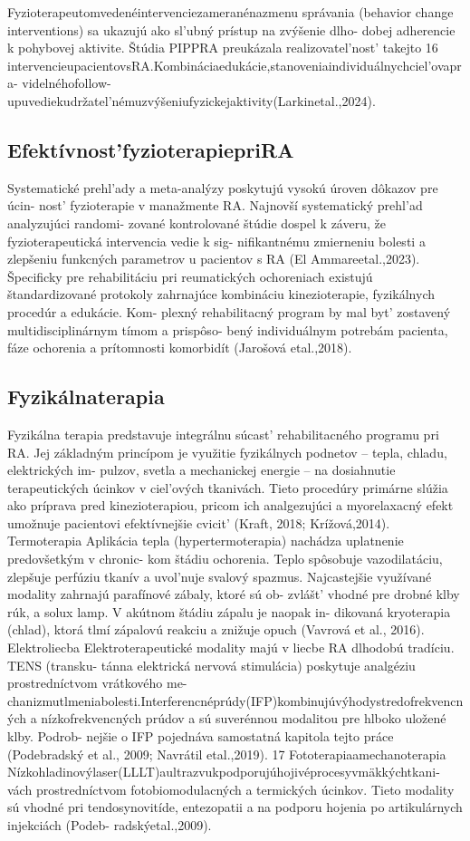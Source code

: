 Fyzioterapeutomvedenéintervenciezameranénazmenu správania (behavior change interventions) sa ukazujú ako sl’ubný prístup na zvýšenie dlho- dobej adherencie k pohybovej aktivite. Štúdia PIPPRA preukázala realizovatel’nost’ takejto 16 intervencieupacientovsRA.Kombináciaedukácie,stanoveniaindividuálnychciel’ovapra- videlnéhofollow-upuvediekudržatel’némuzvýšeniufyzickejaktivity(Larkinetal.,2024).


\subsection{Efektívnost’fyzioterapiepriRA}

Systematické prehl’ady a meta-analýzy poskytujú vysokú úroven dôkazov pre úcin- nost’ fyzioterapie v manažmente RA. Najnovší systematický prehl’ad analyzujúci randomi- zované kontrolované štúdie dospel k záveru, že fyzioterapeutická intervencia vedie k sig- nifikantnému zmierneniu bolesti a zlepšeniu funkcných parametrov u pacientov s RA (El Ammareetal.,2023). Špecificky pre rehabilitáciu pri reumatických ochoreniach existujú štandardizované protokoly zahrnajúce kombináciu kinezioterapie, fyzikálnych procedúr a edukácie. Kom- plexný rehabilitacný program by mal byt’ zostavený multidisciplinárnym tímom a prispôso- bený individuálnym potrebám pacienta, fáze ochorenia a prítomnosti komorbidít (Jarošová etal.,2018).


\subsection{Fyzikálnaterapia}

Fyzikálna terapia predstavuje integrálnu súcast’ rehabilitacného programu pri RA. Jej základným princípom je využitie fyzikálnych podnetov -- tepla, chladu, elektrických im- pulzov, svetla a mechanickej energie -- na dosiahnutie terapeutických úcinkov v ciel’ových tkanivách. Tieto procedúry primárne slúžia ako príprava pred kinezioterapiou, pricom ich analgezujúci a myorelaxacný efekt umožnuje pacientovi efektívnejšie cvicit’ (Kraft, 2018; Krížová,2014). Termoterapia Aplikácia tepla (hypertermoterapia) nachádza uplatnenie predovšetkým v chronic- kom štádiu ochorenia. Teplo spôsobuje vazodilatáciu, zlepšuje perfúziu tkanív a uvol’nuje svalový spazmus. Najcastejšie využívané modality zahrnajú parafínové zábaly, ktoré sú ob- zvlášt’ vhodné pre drobné klby rúk, a solux lamp. V akútnom štádiu zápalu je naopak in- dikovaná kryoterapia (chlad), ktorá tlmí zápalovú reakciu a znižuje opuch (Vavrová et al., 2016). Elektroliecba Elektroterapeutické modality majú v liecbe RA dlhodobú tradíciu. TENS (transku- tánna elektrická nervová stimulácia) poskytuje analgéziu prostredníctvom vrátkového me- chanizmutlmeniabolesti.Interferencnéprúdy(IFP)kombinujúvýhodystredofrekvencných a nízkofrekvencných prúdov a sú suverénnou modalitou pre hlboko uložené klby. Podrob- nejšie o IFP pojednáva samostatná kapitola tejto práce (Podebradský et al., 2009; Navrátil etal.,2019). 17 Fototerapiaamechanoterapia Nízkohladinovýlaser(LLLT)aultrazvukpodporujúhojivéprocesyvmäkkýchtkani- vách prostredníctvom fotobiomodulacných a termických úcinkov. Tieto modality sú vhodné pri tendosynovitíde, entezopatii a na podporu hojenia po artikulárnych injekciách (Podeb- radskýetal.,2009).


